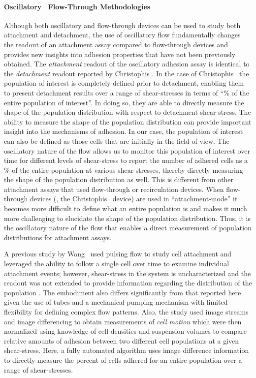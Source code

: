 \paragraph{Oscillatory \vs\ Flow-Through Methodologies}Although both oscillatory and flow-through devices can be used to study both attachment and detachment, the use of oscillatory flow fundamentally changes the readout of an attachment assay compared to flow-through devices and provides new insights into adhesion properties that have not been previously obtained. The \emph{attachment} readout of the oscillatory adhesion assay is identical to the \emph{detachment} readout reported by Christophis \etal. In the case of Christophis \etal\, the population of interest is completely defined prior to detachment, enabling them to present detachment results over a range of shear-stresses in terms of ``\% of the entire population of interest''. In doing so, they are able to directly measure the shape of the population distribution with respect to detachment shear-stress. The ability to measure the shape of the population distribution can provide important insight into the mechanisms of adhesion. In our case, the population of interest can also be defined as those cells that are initially in the field-of-view. The oscillatory nature of the flow allows us to monitor this population of interest over time for different levels of shear-stress to report the number of adhered cells as a \% of the entire population at various shear-stresses, thereby directly measuring the shape of the population distribution as well. This is different from other attachment assays that used flow-through or recirculation devices. When flow-through devices (\eg, the Christophis \etal\ device) are used in ``attachment-mode'' it becomes more difficult to define what an entire population is and makes it much more challenging to elucidate the shape of the population distribution. Thus, it is the oscillatory nature of the flow that enables a direct measurement of population distributions for attachment assays.

A previous study by Wang \etal\ used pulsing flow to study cell attachment and leveraged the ability to follow a single cell over time to examine individual attachment events; however, shear-stress in the system is uncharacterized and the readout was not extended to provide information regarding the distribution of the population \cite{Wang:2009kl}. The embodiment also differs significantly from that reported here given the use of tubes and a mechanical pumping mechanism with limited flexibility for defining complex flow patterns. Also, the study used image streams and image differencing to obtain measurements of \emph{cell motion} which were then normalized using knowledge of cell densities and suspension volumes to compare relative amounts of adhesion between two different cell populations at a given shear-stress. Here, a fully automated algorithm uses image difference information to directly measure the percent of cells adhered for an entire population over a range of shear-stresses.

